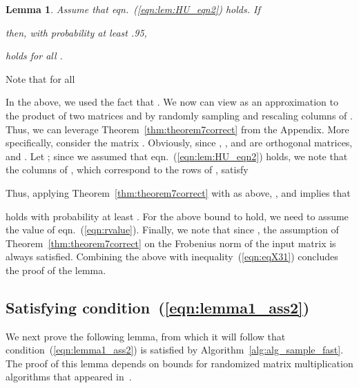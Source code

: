 \documentclass[11pt]{article}
\newtheorem{lemma}{Lemma}
\newenvironment{Proof}{\noindent {\em Proof:}}{\\\hspace*{\fill}\mbox{}}
\begin{document}
\begin{lemma}
\label{lem:sample_lem20pf}
Assume that eqn.~(\ref{eqn:lem:HU_eqn2}) holds. If

then, with probability at least .95,

holds for all .
\end{lemma}
\begin{Proof}
Note that for all 

In the above, we used the fact that . We now can view  as an approximation to the product of two matrices  and  by randomly sampling and rescaling columns of . Thus, we can leverage Theorem~\ref{thm:theorem7correct} from the Appendix. More specifically, consider the matrix . Obviously, since , , and  are orthogonal matrices,  and . Let ; since we assumed that eqn.~(\ref{eqn:lem:HU_eqn2}) holds, we note that the columns of , which correspond to the rows of , satisfy

Thus, applying Theorem~\ref{thm:theorem7correct} with  as above, , and  implies that

holds with probability at least . For the above bound to hold, we need  to assume the value of eqn.~(\ref{eqn:rvalue}). Finally, we note that since , the assumption of Theorem~\ref{thm:theorem7correct} on the Frobenius norm of the input matrix is always satisfied. Combining the above with inequality~(\ref{eqn:eqX31}) concludes the proof of the lemma.
\end{Proof}

\subsection{Satisfying condition~(\ref{eqn:lemma1_ass2})}

We next prove the following lemma, from which it will follow that condition~(\ref{eqn:lemma1_ass2}) is satisfied by Algorithm~\ref{alg:alg_sample_fast}. The proof of this lemma depends on bounds for randomized matrix multiplication algorithms that appeared in~\cite{dkm_matrix1}.
\end{document}
